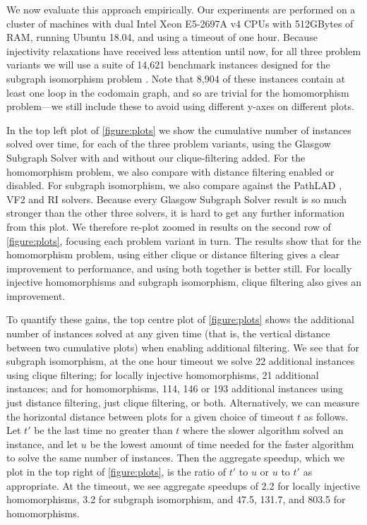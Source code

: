 \documentclass{article}
\begin{document}
We now evaluate this approach empirically. Our experiments are performed on a cluster of machines
with dual Intel Xeon E5-2697A v4 CPUs with 512GBytes of RAM, running Ubuntu 18.04, and using a
timeout of one hour. Because injectivity relaxations have received less attention until now, for all
three problem variants we will use a suite of 14,621 benchmark instances designed for the subgraph
isomorphism problem \cite{DBLP:conf/lion/KotthoffMS16}. Note that 8,904 of these instances contain
at least one loop in the codomain graph, and so are trivial for the homomorphism problem---we still
include these to avoid using different y-axes on different plots.

In the top left plot of \cref{figure:plots} we show the cumulative number of instances solved over
time, for each of the three problem variants, using the Glasgow Subgraph Solver with and without our
clique-filtering added. For the homomorphism problem, we also compare with distance filtering
enabled or disabled. For subgraph isomorphism, we also compare against the PathLAD
\cite{DBLP:conf/lion/KotthoffMS16}, VF2 \cite{DBLP:journals/pami/CordellaFSV04} and RI
\cite{DBLP:journals/bmcbi/BonniciGPSF13} solvers. Because every Glasgow Subgraph Solver result is so
much stronger than the other three solvers, it is hard to get any further information from this
plot. We therefore re-plot zoomed in results on the second row of \cref{figure:plots}, focusing each
problem variant in turn. The results show that for the homomorphism problem, using either clique or
distance filtering gives a clear improvement to performance, and using both together is better
still. For locally injective homomorphisms and subgraph isomorphism, clique filtering also gives an
improvement.

To quantify these gains, the top centre plot of \cref{figure:plots} shows the
additional number of instances solved at any given time (that is, the vertical distance between
two cumulative plots) when enabling additional filtering. We see that for subgraph isomorphism, at
the one hour timeout we solve 22 additional instances using clique filtering; for locally injective
homomorphisms, 21 additional instances; and for homomorphisms, 114, 146 or 193 additional instances
using just distance filtering, just clique filtering, or both. Alternatively, we can measure the
horizontal distance between plots for a given choice of timeout $t$ as follows. Let $t'$
be the last time no greater than $t$ where the slower algorithm solved an instance, and let $u$ be
the lowest amount of time needed for the faster algorithm to solve the same number of instances.
Then the aggregate speedup, which we plot in the top right of \cref{figure:plots}, is the ratio of
$t'$ to $u$ or $u$ to $t'$ as appropriate. At the timeout, we see aggregate speedups of 2.2 for
locally injective homomorphisms, 3.2 for subgraph isomorphism, and 47.5, 131.7, and 803.5 for
homomorphisms.
\end{document}
